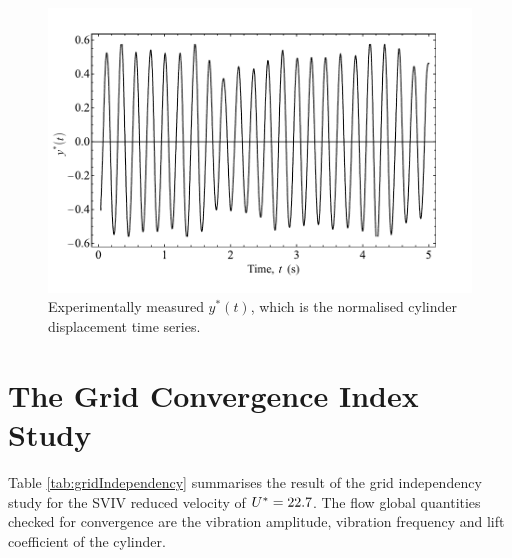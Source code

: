 \documentclass[oneside]{utmthesis}
\begin{document}
\begin{figure}[!h]
  \centering
  \includegraphics[width=1\textwidth]{figs/figure5}
  \caption{Experimentally measured $y^{*}(t)$, which is the normalised cylinder displacement time series.}
  \label{fig:sampTimeHist}
\end{figure}

\section{The Grid Convergence Index Study} \label{sec:gciStudyResult}

Table \ref{tab:gridIndependency} summarises the result of the grid independency study for the SVIV reduced velocity of $U^{*} = 22.7$. The flow global quantities checked for convergence are the vibration amplitude, vibration frequency and lift coefficient of the cylinder.
\end{document}
